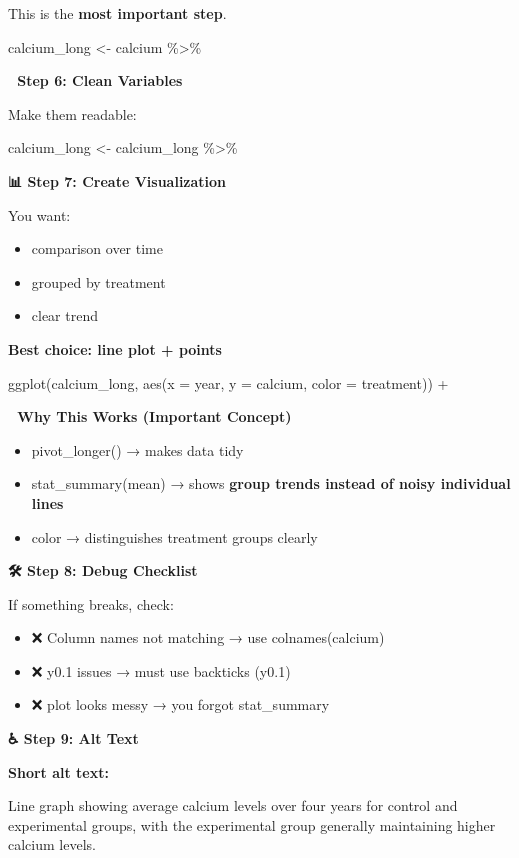 \documentclass[
  letterpaper,
  DIV=11,
  numbers=noendperiod]{scrartcl}
\begin{document}
\begin{itemize}
\begin{itemize}
    This is the \textbf{most important step}.

    calcium\_long \textless- calcium \%\textgreater\%

    \textbf{🧠 Step 6: Clean Variables}

    Make them readable:

    calcium\_long \textless- calcium\_long \%\textgreater\%

    \textbf{📊 Step 7: Create Visualization}

    You want:

    \begin{itemize}
    \item
      comparison over time
    \item
      grouped by treatment
    \item
      clear trend
    \end{itemize}

    \textbf{Best choice: line plot + points}

    ggplot(calcium\_long, aes(x = year, y = calcium, color = treatment))
    +

    \textbf{🎯 Why This Works (Important Concept)}

    \begin{itemize}
    \item
      pivot\_longer() → makes data tidy
    \item
      stat\_summary(mean) → shows \textbf{group trends instead of noisy
      individual lines}
    \item
      color → distinguishes treatment groups clearly
    \end{itemize}

    \textbf{🛠️ Step 8: Debug Checklist}

    If something breaks, check:

    \begin{itemize}
    \item
      ❌ Column names not matching → use colnames(calcium)
    \item
      ❌ y0.1 issues → must use backticks (y0.1)
    \item
      ❌ plot looks messy → you forgot stat\_summary
    \end{itemize}

    \textbf{♿ Step 9: Alt Text}

    \textbf{Short alt text:}

    Line graph showing average calcium levels over four years for
    control and experimental groups, with the experimental group
    generally maintaining higher calcium levels.


\end{itemize}
\end{itemize}
\end{document}
